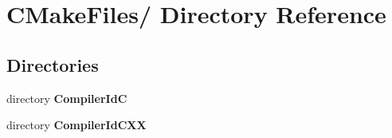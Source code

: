 \section{\-C\-Make\-Files/ \-Directory \-Reference}
\label{dir_5c72a489a2987a0dd1bd8607306414ae}
\subsection*{\-Directories}
\begin{DoxyCompactItemize}
\item 
directory {\bf \-Compiler\-Id\-C}
\item 
directory {\bf \-Compiler\-Id\-C\-X\-X}
\end{DoxyCompactItemize}

